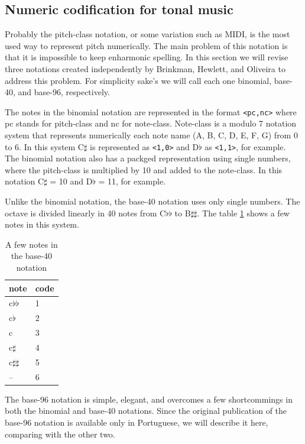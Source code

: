 \documentclass{article}
\begin{document}
\subsection{Numeric codification for tonal music}
\label{sec:codificacao-jamary}

Probably the pitch-class notation, or some variation such as MIDI, is
the most used way to represent pitch numerically. The main problem of
this notation is that it is impossible to keep enharmonic spelling. In
this section we will revise three notations created independently by
Brinkman, Hewlett, and Oliveira
\cite{brinkman86:_binom_repres_of_pitch_for,hewlett92:base40,oliveira01:codificacao}
to address this problem. For simplicity sake's we will call each one
binomial, base-40, and base-96, respectively.

The notes in the binomial notation are represented in the format
\texttt{<pc,nc>} where pc stands for pitch-class and nc for
note-class. Note-class is a modulo 7 notation system that represents
numerically each note name (A, B, C, D, E, F, G) from 0 to 6. In this
system C$\sharp$ is represented as \texttt{<1,0>} and D$\flat$ as
\texttt{<1,1>}, for example. The binomial notation also has a packged
representation using single numbers, where the pitch-class is
multiplied by 10 and added to the note-class. In this notation C$\sharp$
= 10 and D$\flat$ = 11, for example.

Unlike the binomial notation, the base-40 notation uses only single
numbers. The octave is divided linearly in 40 notes from C$\flat\flat$
to B$\sharp\sharp$. The table \ref{tab:base40} shows a few notes in
this system.

\begin{table}
  \centering
  \begin{tabular}{l|l}
    note & code \\
    \hline
    c$\flat\flat$ & 1 \\
    c$\flat$ & 2 \\
    c & 3 \\
    c$\sharp$ & 4 \\
    c$\sharp\sharp$ & 5 \\
    -- & 6 \\
  \end{tabular}
  \caption{A few notes in the base-40 notation}
  \label{tab:base40}
\end{table}

The base-96 notation is simple, elegant, and overcomes a few
shortcommings in both the binomial and base-40 notations. Since the
original publication of the base-96 notation is available only in
Portuguese, we will describe it here, comparing with the other
two.
\end{document}
